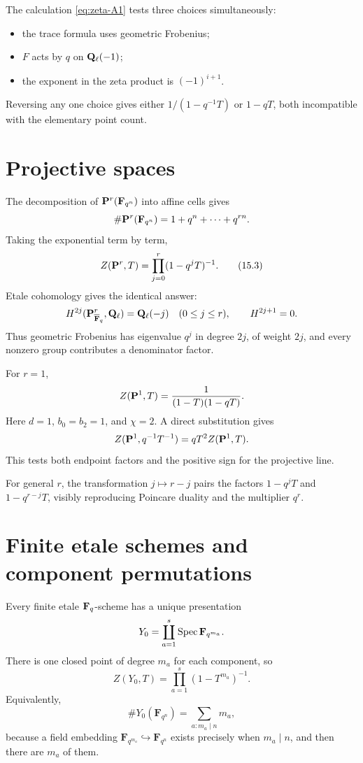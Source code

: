 \begin{convention}
The calculation \eqref{eq:zeta-A1} tests three choices simultaneously:
\begin{itemize}
\item the trace formula uses geometric Frobenius;
\item \(F\) acts by \(q\) on \(\mathbf Q_\ell(-1)\);
\item the exponent in the zeta product is \((-1)^{i+1}\).
\end{itemize}
Reversing any one choice gives either \(1/(1-q^{-1}T)\) or
\(1-qT\), both incompatible with the elementary point count.
\end{convention}

\section{Projective spaces}

The decomposition of \(\mathbf P^r(\mathbf F_{q^n})\) into affine cells gives
\[
 \#\mathbf P^r(\mathbf F_{q^n})=1+q^n+\cdots+q^{rn}.
\]
Taking the exponential term by term,
\[
 Z(\mathbf P^r,T)=\prod_{j=0}^r(1-q^jT)^{-1}.
 \tag{15.3}\label{eq:zeta-projective-space}
\]
Etale cohomology gives the identical answer:
\[
 H^{2j}(\mathbf P^r_{\overline{\mathbf F}_q},\mathbf Q_\ell)=\mathbf Q_\ell(-j)
 \quad(0\leq j\leq r),\qquad
 H^{2j+1}=0.
\]
Thus geometric Frobenius has eigenvalue \(q^j\) in degree \(2j\), of
weight \(2j\), and every nonzero group contributes a denominator factor.

For \(r=1\),
\[
 Z(\mathbf P^1,T)=\frac1{(1-T)(1-qT)}.
\]
Here \(d=1\), \(b_0=b_2=1\), and \(\chi=2\).  A direct substitution gives
\[
 Z(\mathbf P^1,q^{-1}T^{-1})=qT^2Z(\mathbf P^1,T).
\]
This tests both endpoint factors and the positive sign for the
projective line.

For general \(r\), the transformation \(j\mapsto r-j\) pairs the factors
\(1-q^jT\) and \(1-q^{r-j}T\), visibly reproducing Poincare duality and
the multiplier \(q^r\).

\section{Finite etale schemes and component permutations}

Every finite etale \(\mathbf F_q\)-scheme has a unique presentation
\[
 Y_0=\coprod_{a=1}^s\operatorname{Spec}\mathbf F_{q^{m_a}}.
\]
There is one closed point of degree \(m_a\) for each component, so
\[
 Z(Y_0,T)=\prod_{a=1}^s(1-T^{m_a})^{-1}.
 \tag{15.4}\label{eq:zeta-finite-etale}
\]
Equivalently,
\[
 \#Y_0(\mathbf F_{q^n})
 =\sum_{a:m_a\mid n}m_a,
\]
because a field embedding
\(\mathbf F_{q^{m_a}}\hookrightarrow\mathbf F_{q^n}\) exists precisely
when \(m_a\mid n\), and then there are \(m_a\) of them.

